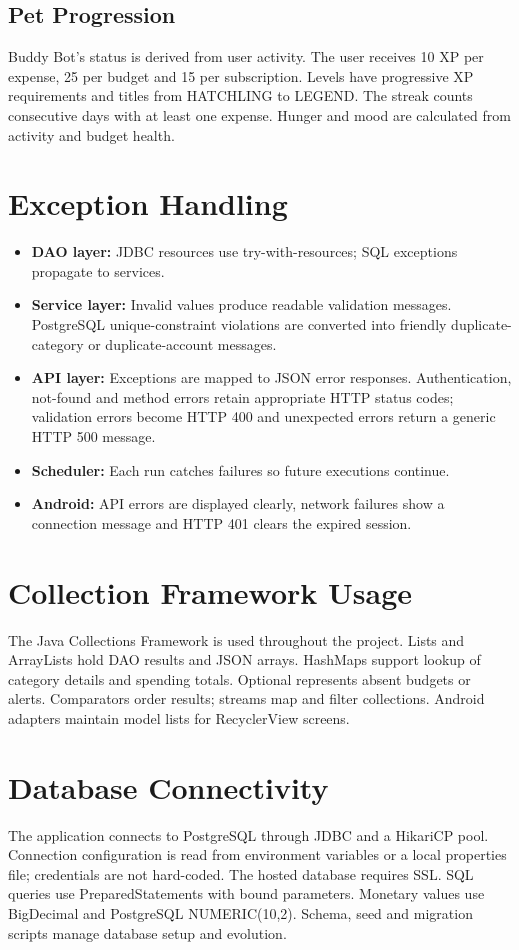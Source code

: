 \documentclass[12pt,a4paper]{report}
\begin{document}
\subsection{Pet Progression}
Buddy Bot's status is derived from user activity. The user receives 10 XP per expense, 25 per budget and 15 per subscription. Levels have progressive XP requirements and titles from HATCHLING to LEGEND. The streak counts consecutive days with at least one expense. Hunger and mood are calculated from activity and budget health.

\section{Exception Handling}
\begin{itemize}
\item \textbf{DAO layer:} JDBC resources use try-with-resources; SQL exceptions propagate to services.
\item \textbf{Service layer:} Invalid values produce readable validation messages. PostgreSQL unique-constraint violations are converted into friendly duplicate-category or duplicate-account messages.
\item \textbf{API layer:} Exceptions are mapped to JSON error responses. Authentication, not-found and method errors retain appropriate HTTP status codes; validation errors become HTTP 400 and unexpected errors return a generic HTTP 500 message.
\item \textbf{Scheduler:} Each run catches failures so future executions continue.
\item \textbf{Android:} API errors are displayed clearly, network failures show a connection message and HTTP 401 clears the expired session.
\end{itemize}

\section{Collection Framework Usage}
The Java Collections Framework is used throughout the project. Lists and ArrayLists hold DAO results and JSON arrays. HashMaps support lookup of category details and spending totals. Optional represents absent budgets or alerts. Comparators order results; streams map and filter collections. Android adapters maintain model lists for RecyclerView screens.

\section{Database Connectivity}
The application connects to PostgreSQL through JDBC and a HikariCP pool. Connection configuration is read from environment variables or a local properties file; credentials are not hard-coded. The hosted database requires SSL. SQL queries use PreparedStatements with bound parameters. Monetary values use BigDecimal and PostgreSQL NUMERIC(10,2). Schema, seed and migration scripts manage database setup and evolution.
\end{document}
